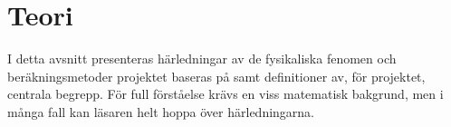 \section{Teori}

I detta avsnitt presenteras härledningar av de fysikaliska fenomen och beräkningsmetoder projektet baseras på samt definitioner av, för projektet, centrala begrepp. För full förståelse krävs en viss matematisk bakgrund, men i många fall kan läsaren helt hoppa över härledningarna. 















